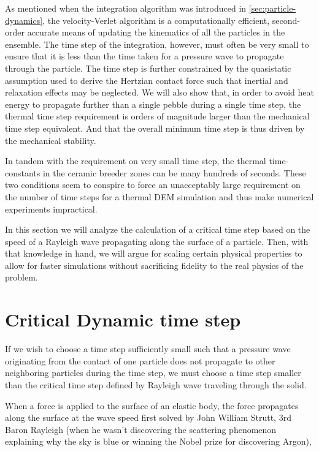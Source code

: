 As mentioned when the integration algorithm was introduced in \cref{sec:particle-dynamics}, the velocity-Verlet algorithm is a computationally efficient, second-order accurate means of updating the kinematics of all the particles in the ensemble\cite{Kruggel-Emden2008}. The time step of the integration, however, must often be very small to ensure that it is less than the time taken for a pressure wave to propagate through the particle. The time step is further constrained by the quasistatic assumption used to derive the Hertzian contact force such that inertial and relaxation effects may be neglected\cite{Brilliantov1996}. We will also show that, in order to avoid heat energy to propagate further than a single pebble during a single time step, the thermal time step requirement is orders of magnitude larger than the mechanical time step equivalent. And that the overall minimum time step is thus driven by the mechanical stability.

In tandem with the requirement on very small time step, the thermal time-constants in the ceramic breeder zones can be many hundreds of seconds. These two conditions seem to conspire to force an unacceptably large requirement on the number of time steps for a thermal DEM simulation and thus make numerical experiments impractical.

In this section we will analyze the calculation of a critical time step based on the speed of a Rayleigh wave propagating along the surface of a particle. Then, with that knowledge in hand, we will argue for scaling certain physical properties to allow for faster simulations without sacrificing fidelity to the real physics of the problem.


\section{Critical Dynamic time step}
If we wish to choose a time step sufficiently small such that a pressure wave originating from the contact of one particle does not propagate to other neighboring particles during the time step, we must choose a time step smaller than the critical time step defined by Rayleigh wave traveling through the solid.

When a force is applied to the surface of an elastic body, the force propagates along the surface at the wave speed first solved by John William Strutt, 3rd Baron Rayleigh\cite{Rayleigh1885} (when he wasn't discovering the scattering phenomenon explaining why the sky is blue or winning the Nobel prize for discovering Argon),

